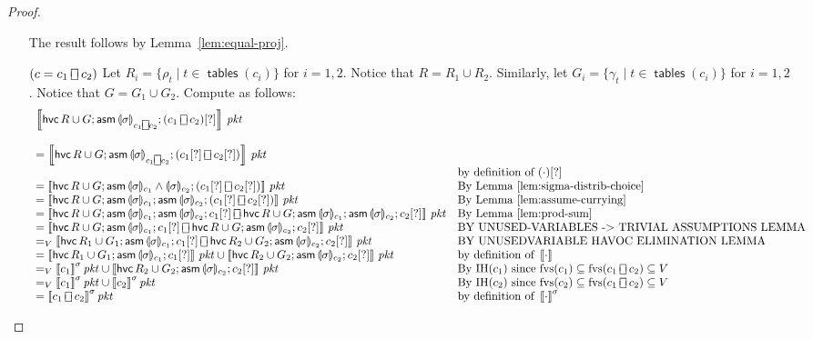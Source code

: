 \documentclass{article}
\newcommand{\pkt}{\mathit{pkt}}
\newcommand{\denote}[1]{\left\llbracket#1\right\rrbracket}
\newcommand{\assume}{\mathop{\mathsf{asm}}}
\newcommand{\choiceop}{\rotatebox[origin=c]{90}{$\sqsubset\!\!\!\sqsupset$}}
\newcommand{\choice}{\mathbin{\choiceop}}
\newcommand{\havoc}[1]{\mathop{\mathsf{hvc}}#1}
\newcommand{\state}[1]{\llparenthesis#1\rrparenthesis}
\newcommand{\instr}{[?]}
\newcommand{\fvs}{\textrm{fvs}}
\newcommand{\tables}{\mathop{\mathsf{tables}}}
\begin{document}
\begin{proof}
\begin{enumerate}[align=left]
    The result follows by Lemma~\ref{lem:equal-proj}.

  \item[$(c = c_1\choice c_2)$] Let $R_i = \{\rho_t \mid t \in \tables(c_i)\}$ for $i =
    1,2$. Notice that $R = R_1 \cup R_2$. Similarly, let $G_i = \{\gamma_t \mid
    t \in \tables(c_i)\}$ for $i = 1,2$. Notice that $G = G_1 \cup G_2$. Compute
    as follows:
    \[\begin{array}{ll}
    \denote{\havoc{R \cup G};\assume{\state\sigma_{c_1\choice c_2}}; (c_1 \choice c_2)\instr}\,\pkt\\
    & \\
    = \denote{\havoc{R \cup G};\assume{\state\sigma_{c_1\choice c_2}}; (c_1\instr \choice c_2\instr)}\,\pkt\\
    & \text{by definition of }(\cdot)\instr\\
    = \denote{\havoc{R \cup G};\assume{\state\sigma_{c_1} \wedge \state\sigma_{c_2}}; (c_1\instr \choice c_2\instr)}\,\pkt
    & \text{By Lemma~\ref{lem:sigma-distrib-choice}}\\
    = \denote{\havoc{R \cup G};\assume{\state\sigma_{c_1}}; \assume{\state\sigma_{c_2}}; (c_1\instr  \choice   c_2\instr)}\,\pkt
    & \text{By Lemma~\ref{lem:assume-currying}}\\
    = \denote{\havoc{R \cup G};\assume{\state\sigma_{c_1}}; \assume{\state\sigma_{c_2}}; c_1\instr
      \choice \havoc{R \cup G};\assume{\state\sigma_{c_1}}; \assume{\state\sigma_{c_2}}; c_2\instr}\,\pkt
    & \text{By Lemma~\ref{lem:prod-sum}} \\
    = \denote{\havoc{R \cup G}; \assume{\state\sigma_{c_1}}; c_1\instr
      \choice \havoc{R \cup G}; \assume{\state\sigma_{c_2}}; c_2\instr}\,\pkt
    & \text{BY UNUSED-VARIABLES -> TRIVIAL ASSUMPTIONS LEMMA} \\
    =_V \denote{\havoc{R_1 \cup G_1}; \assume{\state\sigma_{c_1}}; c_1\instr
      \choice \havoc{R_2 \cup G_2}; \assume{\state\sigma_{c_2}}; c_2\instr}\,\pkt
    & \text{BY UNUSEDVARIABLE HAVOC ELIMINATION LEMMA } \\
    = \denote{\havoc{R_1 \cup G_1}; \assume{\state\sigma_{c_1}}; c_1\instr}\,\pkt
    \cup \denote{\havoc{R_2 \cup G_2}; \assume{\state\sigma_{c_2}}; c_2\instr}\,\pkt
    & \text{by definition of }\denote{\cdot} \\
    =_V \denote{c_1}^\sigma\pkt \cup \denote{\havoc{R_2 \cup G_2}; \assume{\state\sigma_{c_2}}; c_2\instr}\,\pkt
    & \text{By IH}(c_1) \text{ since } \fvs(c_1) \subseteq \fvs(c_1 \choice c_2) \subseteq V \\
    =_V \denote{c_1}^\sigma\pkt \cup \denote{c_2}^\sigma\pkt
    & \text{By IH}(c_2) \text{ since } \fvs(c_2) \subseteq \fvs(c_1 \choice c_2) \subseteq V \\
    = \denote{c_1 \choice c_2}^\sigma\pkt
    & \text{by definition of }\denote{\cdot}^\sigma
    \end{array}
    \]


\end{enumerate}
\end{proof}
\end{document}
